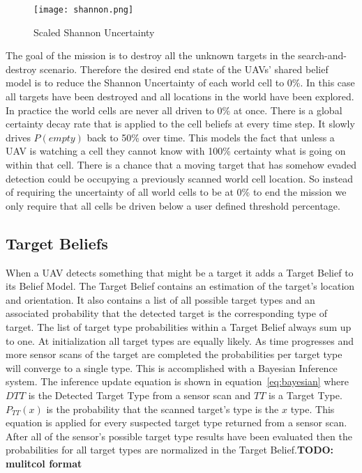 \begin{multicols*}{2}

\begin{figure}[H]
	\centering
	\texttt{[image: shannon.png]}
	\caption{Scaled Shannon Uncertainty}
	\label{fig:shannon}
\end{figure}

The goal of the mission is to destroy all the unknown targets in the search-and-destroy scenario.  Therefore the desired end state of the UAVs' shared belief model is to reduce the Shannon Uncertainty of each world cell to 0\%.  In this case all targets have been destroyed and all locations in the world have been explored.  In practice the world cells are never all driven to 0\% at once.  There is a global certainty decay rate that is applied to the cell beliefs at every time step.  It slowly drives $P(empty)$ back to 50\% over time.  This models the fact that unless a UAV is watching a cell they cannot know with 100\% certainty what is going on within that cell.  There is a chance that a moving target that has somehow evaded detection could be occupying a previously scanned world cell location.  So instead of requiring the uncertainty of all world cells to be at 0\% to end the mission we only require that all cells be driven below a user defined threshold percentage.

\subsection{Target Beliefs}
When a UAV detects something that might be a target it adds a Target Belief to its Belief Model.  The Target Belief contains an estimation of the target's location and orientation.  It also contains a list of all possible target types and an associated probability that the detected target is the corresponding type of target. The list of target type probabilities within a Target Belief always sum up to one.  At initialization all target types are equally likely.  As time progresses and more sensor scans of the target are completed the probabilities per target type will converge to a single type.  This is accomplished with a Bayesian Inference system.  The inference update equation is shown in equation~\ref{eq:bayesian} where $DTT$ is the Detected Target Type from a sensor scan and $TT$ is a Target Type. $P_{TT}(x)$ is the probability that the scanned target's type is the $x$ type.  This equation is applied for every suspected target type returned from a sensor scan.  After all of the sensor's possible target type results have been evaluated then the probabilities for all target types are normalized in the Target Belief.\textbf{TODO: mulitcol format}


\end{multicols*}
